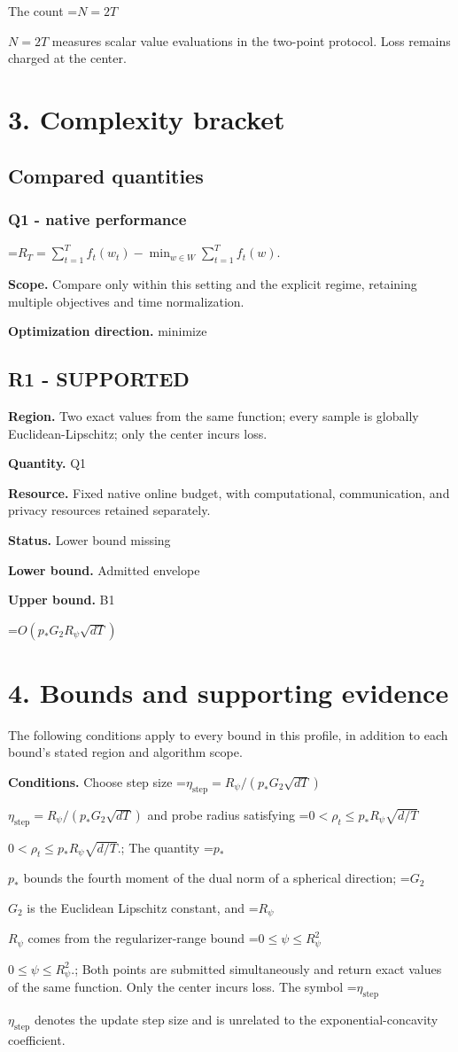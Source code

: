 \documentclass[10pt,a4paper]{article}
\newcommand{\AtlasMath}[1]{\par\begingroup\centering\setbox0=\hbox{$\displaystyle #1$}\ifdim\wd0>1.4\linewidth\typeout{ATLAS WIDE FORMULA: \the\wd0}\fi\ifdim\wd0>\linewidth\resizebox{\linewidth}{!}{\box0}\else\box0\fi\par\endgroup}
\newcommand{\AtlasInlineMath}[1]{\begingroup\setbox0=\hbox{$#1$}\ifdim\wd0>.4\linewidth\endgroup\AtlasMath{#1}\else\endgroup$#1$\fi}
\begin{document}
The count \AtlasInlineMath{N=2T} measures scalar value evaluations in the two-point protocol. Loss remains charged at the center.

\section{3. Complexity bracket}
\subsection{Compared quantities}
\subsubsection{Q1 - native performance}
\AtlasMath{R_T=\sum_{t=1}^T f_t(w_t)-\min_{w\in W}\sum_{t=1}^T f_t(w).}
\textbf{Scope.} Compare only within this setting and the explicit regime, retaining multiple objectives and time normalization.

\textbf{Optimization direction.} minimize

\subsection{R1 - SUPPORTED}
\textbf{Region.} Two exact values from the same function; every sample is globally Euclidean-Lipschitz; only the center incurs loss.

\textbf{Quantity.} Q1

\textbf{Resource.} Fixed native online budget, with computational, communication, and privacy resources retained separately.

\textbf{Status.} Lower bound missing

\textbf{Lower bound.} Admitted envelope

\textbf{Upper bound.} B1

\AtlasMath{O(p_*G_2R_\psi\sqrt{dT})}
\section{4. Bounds and supporting evidence}
The following conditions apply to every bound in this profile, in addition to each bound's stated region and algorithm scope.

\textbf{Conditions.} Choose step size \AtlasInlineMath{\eta_{\mathrm{step}}=R_\psi/(p_*G_2\sqrt{dT})} and probe radius satisfying \AtlasInlineMath{0<\rho_t\le p_*R_\psi\sqrt{d/T}}.; The quantity \AtlasInlineMath{p_*} bounds the fourth moment of the dual norm of a spherical direction; \AtlasInlineMath{G_2} is the Euclidean Lipschitz constant, and \AtlasInlineMath{R_\psi} comes from the regularizer-range bound \AtlasInlineMath{0\le\psi\le R_\psi^2}.; Both points are submitted simultaneously and return exact values of the same function. Only the center incurs loss. The symbol \AtlasInlineMath{\eta_{\mathrm{step}}} denotes the update step size and is unrelated to the exponential-concavity coefficient.
\end{document}
